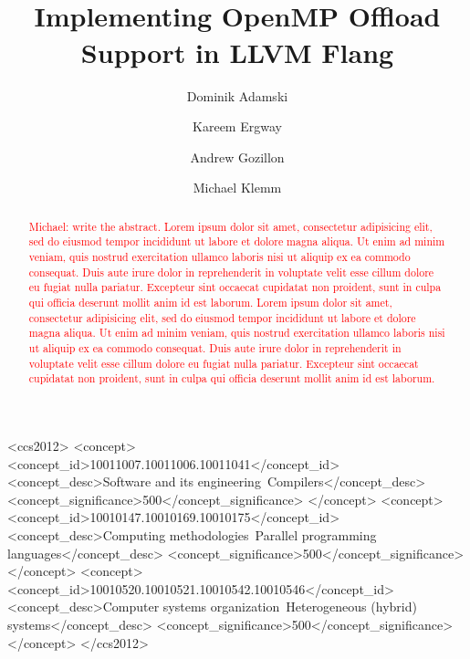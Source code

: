 \documentclass[acmtog,natbib=false]{acmart}
\newcommand{\todo}[1]{\textcolor{red}{#1}}
\newcommand{\registered}[0]{\textsuperscript{\textregistered}\xspace}
\begin{document}
\title{Implementing OpenMP\registered Offload Support in LLVM Flang}

\author{Dominik Adamski}
\orcid{}

\author{Kareem Ergway}

\author{Andrew Gozillon}

\author{Michael Klemm}

\renewcommand{\shortauthors}{Adamski et al.}

\begin{abstract}
\todo{Michael: write the abstract.}
\todo{Lorem ipsum dolor sit amet, consectetur adipisicing elit, sed do eiusmod
tempor incididunt ut labore et dolore magna aliqua. Ut enim ad minim veniam,
quis nostrud exercitation ullamco laboris nisi ut aliquip ex ea commodo
consequat. Duis aute irure dolor in reprehenderit in voluptate velit esse
cillum dolore eu fugiat nulla pariatur. Excepteur sint occaecat cupidatat non
proident, sunt in culpa qui officia deserunt mollit anim id est laborum.
Lorem ipsum dolor sit amet, consectetur adipisicing elit, sed do eiusmod
tempor incididunt ut labore et dolore magna aliqua. Ut enim ad minim veniam,
quis nostrud exercitation ullamco laboris nisi ut aliquip ex ea commodo
consequat. Duis aute irure dolor in reprehenderit in voluptate velit esse
cillum dolore eu fugiat nulla pariatur. Excepteur sint occaecat cupidatat non
proident, sunt in culpa qui officia deserunt mollit anim id est laborum.}
\end{abstract}

\begin{CCSXML}
<ccs2012>
   <concept>
       <concept_id>10011007.10011006.10011041</concept_id>
       <concept_desc>Software and its engineering~Compilers</concept_desc>
       <concept_significance>500</concept_significance>
       </concept>
   <concept>
       <concept_id>10010147.10010169.10010175</concept_id>
       <concept_desc>Computing methodologies~Parallel programming languages</concept_desc>
       <concept_significance>500</concept_significance>
       </concept>
   <concept>
       <concept_id>10010520.10010521.10010542.10010546</concept_id>
       <concept_desc>Computer systems organization~Heterogeneous (hybrid) systems</concept_desc>
       <concept_significance>500</concept_significance>
       </concept>
 </ccs2012>
\end{CCSXML}
\end{document}
